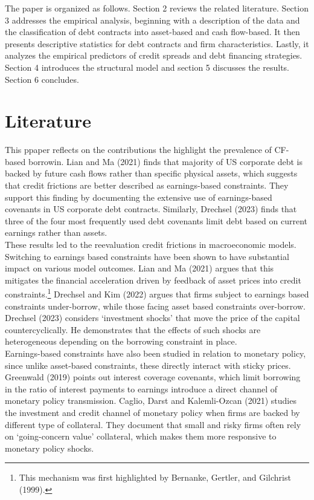 \documentclass[12pt]{article}
\begin{document}
The paper is organized as follows. Section 2 reviews the related literature. Section 3 addresses the empirical analysis, beginning with a description of the data and the classification of debt contracts into asset-based and cash flow-based. It then presents descriptive statistics for debt contracts and firm characteristics. Lastly, it analyzes the empirical predictors of credit spreads and debt financing strategies. Section 4 introduces the structural model and section 5 discusses the results. Section 6 concludes.

\section{Literature \label{sec:literature}} 
This ppaper reflects on the contributions the highlight the prevalence of CF-based borrowin. Lian and Ma (2021) finds that majority of US corporate debt is backed by future cash flows rather than specific physical assets, which suggests that credit frictions are better described as earnings-based constraints. They support this finding by documenting the extensive use of earnings-based covenants in US corporate debt contracts. Similarly, Drechsel (2023) finds that three of the four most frequently used debt covenants limit debt based on current earnings rather than assets. \vspace{3mm} \\
These results led to the reevaluation credit frictions in macroeconomic models. Switching to earnings based constraints have been shown to have substantial impact on various model outcomes. Lian and Ma (2021) argues that this mitigates the financial acceleration driven by feedback of asset prices into credit constraints.\footnote{This mechanism was first highlighted by Bernanke, Gertler, and Gilchrist (1999).} Drechsel and Kim (2022) argues that firms subject to earnings based constraints under-borrow, while those facing asset based constraints over-borrow. Drechsel (2023) considers `investment shocks' that move the price of the capital countercyclically. He demonstrates that the effects of such shocks are heterogeneous depending on the borrowing constraint in place.  \vspace{3mm} \\
Earnings-based constraints have also been studied in relation to monetary policy, since unlike asset-based constraints, these directly interact with sticky prices. Greenwald (2019) points out interest coverage covenants, which limit borrowing in the ratio of interest payments to earnings introduce a direct channel of monetary policy transmission. Caglio, Darst and Kalemli-Ozcan (2021) studies the investment and credit channel of monetary policy when firms are backed by different type of collateral. They document that small and risky firms often rely on `going-concern value' collateral, which makes them more responsive to monetary policy shocks. \vspace{3mm} \\
\end{document}
